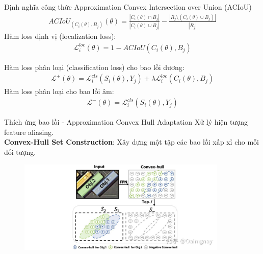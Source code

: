 \documentclass[11pt]{beamer}
\theoremstyle{definition}
\theoremstyle{plain}
\theoremstyle{plain}
\theoremstyle{remark}
\begin{document}
\begin{frame}{Định nghĩa công thức Approximation Convex Intersection over Union (ACIoU)}
		\begin{align} 
			ACIoU_{(C_i (\theta), B_j)} (\theta) = \frac{|C_i(\theta) \cap B_j|}{|C_i(\theta) \cup B_j|} - \frac{|R_j \setminus (C_i(\theta) \cup B_j)|}{|R_j|}
		\end{align}	
		Hàm loss định vị (localization loss):
		\begin{align} \label{ptdd0}
			\mathcal{L}_i^{loc} (\theta) = 1 - ACIoU(C_i(\theta), B_j)
		\end{align}
\end{frame}
	\begin{frame}
		Hàm loss phân loại (classification loss) cho bao lồi dương:\\
		\begin{align} \label{ptdd2}
			\mathcal{L}^+ (\theta) = \mathcal{L}_i^{cls}(S_i(\theta), Y_j) +\lambda 	\mathcal{L}_i^{loc}(C_i(\theta), B_j)
		\end{align}
		Hàm loss phân loại cho bao lồi âm:\\
		\begin{align} \label{ptdd3}
			\mathcal{L}^- (\theta) = \mathcal{L}_i^{cls}(S_i(\theta), Y_j) 
		\end{align}
		
	\end{frame}
	\begin{frame}{Thích ứng bao lồi - Approximation Convex Hull Adaptation}
		Xử lý hiện tượng feature aliasing. \\
		\textbf{Convex-Hull Set Construction}: Xây dựng một tập các bao lồi xấp xỉ cho mỗi đối tượng.
		\begin{figure}[ht!]
			\begin{center}
				\includegraphics[width=10cm]{./Hinh_8.jpg}
			\end{center}
		\end{figure}
	\end{frame}
	
\end{document}
